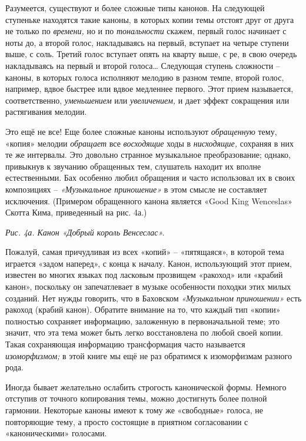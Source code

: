 \documentclass[../main.tex]{subfiles}
\begin{document}
Разумеется, существуют и более сложные типы канонов. На следующей ступеньке находятся такие каноны, в которых копии темы отстоят друг от друга не только по \emph{времени,} но и по \emph{тональности} скажем, первый голос начинает с ноты до, а второй голос, накладываясь на первый, вступает на четыре ступени выше, с соль. Третий голос вступает опять на кварту выше, с ре, в свою очередь накладываясь на первый и второй голоса\ldots{} Следующая ступень сложности \--- каноны, в которых голоса исполняют мелодию в разном темпе, второй голос, например, вдвое быстрее или вдвое медленнее первого. Этот прием называется, соответственно, \emph{уменьшением} или \emph{увеличением,} и дает эффект сокращения или растягивания мелодии.

Это ещё не все! Еще более сложные каноны используют \emph{обращенную} тему, «копия» мелодии \emph{обращает} все \emph{восходящие} ходы в \emph{нисходящие,} сохраняя в них те же интервалы. Это довольно странное музыкальное преобразование; однако, привыкнув к звучанию обращенных тем, слушатель находит их вполне естественными. Бах особенно любил обращения и часто использовал их в своих композициях \--- \emph{«Музыкальное приношение»} в этом смысле не составляет исключения. (Примером обращенного канона является «Good King Wenceslas» Скотта Кима, приведенный на рис. 4а.)

\emph{Рис. 4а. Канон «Добрый король Венсеслас».}

Пожалуй, самая причудливая из всех «копий» \--- «пятящаяся», в которой тема играется «задом наперед», с конца к началу. Канон, использующий этот прием, известен во многих языках под ласковым прозвищем «ракоход» или «крабий канон», поскольку он запечатлевает в музыке особенности походки этих милых созданий. Нет нужды говорить, что в Баховском \emph{«Музыкальном приношении»} есть ракоход (крабий канон). Обратите внимание на то, что каждый тип «копии» полностью сохраняет информацию, заложенную в первоначальной теме; это значит, что эта тема может быть легко восстановлена по любой своей копии. Такая сохраняющая информацию трансформация часто называется \emph{изоморфизмом;} в этой книге мы ещё не раз обратимся к изоморфизмам разного рода.

Иногда бывает желательно ослабить строгость канонической формы. Немного отступив от точного копирования темы, можно достигнуть более полной гармонии. Некоторые каноны имеют к тому же «свободные» голоса, не повторяющие тему, а просто состоящие в приятном согласовании с «каноническими» голосами.
\end{document}
